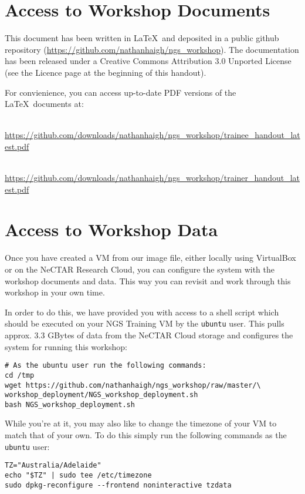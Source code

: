 \section{Access to Workshop Documents}

This document has been written in \LaTeX\ and deposited in a public github
repository (\url{https://github.com/nathanhaigh/ngs_workshop}). The
documentation has been released under a Creative Commons Attribution 3.0
Unported License (see the Licence page at the beginning of this handout).

For convienience, you can access up-to-date PDF versions of the \LaTeX\ documents at:
\begin{description}[style=multiline,labelindent=0cm,align=left,leftmargin=0.5cm]
\item[Trainee Handout]\hfill\\
\url{https://github.com/downloads/nathanhaigh/ngs_workshop/trainee_handout_latest.pdf}
\item[Trainer Handout]\hfill\\
\url{https://github.com/downloads/nathanhaigh/ngs_workshop/trainer_handout_latest.pdf}
\end{description}

\section{Access to Workshop Data}
Once you have created a VM from our image file, either locally using VirtualBox
or on the NeCTAR Research Cloud, you can configure the system with the workshop
documents and data. This way you can revisit and work through this workshop in
your own time.

In order to do this, we have provided you with access to a shell script which
should be executed on your NGS Training VM by the \texttt{ubuntu} user. This pulls
approx. 3.3 GBytes of data from the NeCTAR Cloud storage and configures the system
for running this workshop:

\begin{lstlisting}
# As the ubuntu user run the following commands:
cd /tmp
wget https://github.com/nathanhaigh/ngs_workshop/raw/master/\
workshop_deployment/NGS_workshop_deployment.sh
bash NGS_workshop_deployment.sh
\end{lstlisting}

While you're at it, you may also like to change the timezone of your VM to match
that of your own. To do this simply run the following commands as the
\texttt{ubuntu} user:
\begin{lstlisting}
TZ="Australia/Adelaide"
echo "$TZ" | sudo tee /etc/timezone
sudo dpkg-reconfigure --frontend noninteractive tzdata
\end{lstlisting}

